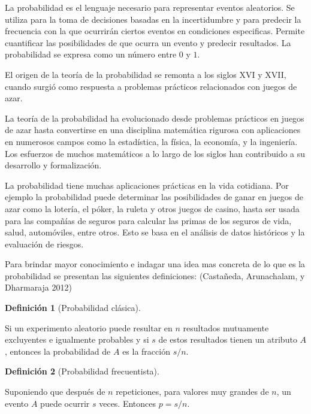 \documentclass[
  us-letterpaper,
]{scrreprt}
\theoremstyle{plain}
\theoremstyle{plain}
\theoremstyle{definition}
\newtheorem{definition}{Definición}[chapter]
\theoremstyle{remark}
\begin{document}
La probabilidad es el lenguaje necesario para representar eventos
aleatorios. Se utiliza para la toma de decisiones basadas en la
incertidumbre y para predecir la frecuencia con la que ocurrirán ciertos
eventos en condiciones especificas. Permite cuantificar las
posibilidades de que ocurra un evento y predecir resultados. La
probabilidad se expresa como un número entre \(0\) y \(1\).

El origen de la teoría de la probabilidad se remonta a los siglos XVI y
XVII, cuando surgió como respuesta a problemas prácticos relacionados
con juegos de azar.

La teoría de la probabilidad ha evolucionado desde problemas prácticos
en juegos de azar hasta convertirse en una disciplina matemática
rigurosa con aplicaciones en numerosos campos como la estadística, la
física, la economía, y la ingeniería. Los esfuerzos de muchos
matemáticos a lo largo de los siglos han contribuido a su desarrollo y
formalización.

La probabilidad tiene muchas aplicaciones prácticas en la vida
cotidiana. Por ejemplo la probabilidad puede determinar las
posibilidades de ganar en juegos de azar como la lotería, el póker, la
ruleta y otros juegos de casino, hasta ser usada para las compañías de
seguros para calcular las primas de los seguros de vida, salud,
automóviles, entre otros. Esto se basa en el análisis de datos
históricos y la evaluación de riesgos.

Para brindar mayor conocimiento e indagar una idea mas concreta de lo
que es la probabilidad se presentan las siguientes definiciones:
(Castañeda, Arunachalam, y Dharmaraja 2012)

\begin{definition}[Probabilidad
clásica]\protect\hypertarget{def-pclas}{}\label{def-pclas}

Si un experimento aleatorio puede resultar en \(n\) resultados
mutuamente excluyentes e igualmente probables y si \(s\) de estos
resultados tienen un atributo \(A\), entonces la probabilidad de \(A\)
es la fracción \(s/n\).

\end{definition}

\begin{definition}[Probabilidad
frecuentista]\protect\hypertarget{def-pfrec}{}\label{def-pfrec}

Suponiendo que después de \(n\) repeticiones, para valores muy grandes
de \(n\), un evento \(A\) puede ocurrir \(s\) veces. Entonces \(p=s/n\).

\end{definition}
\end{document}
